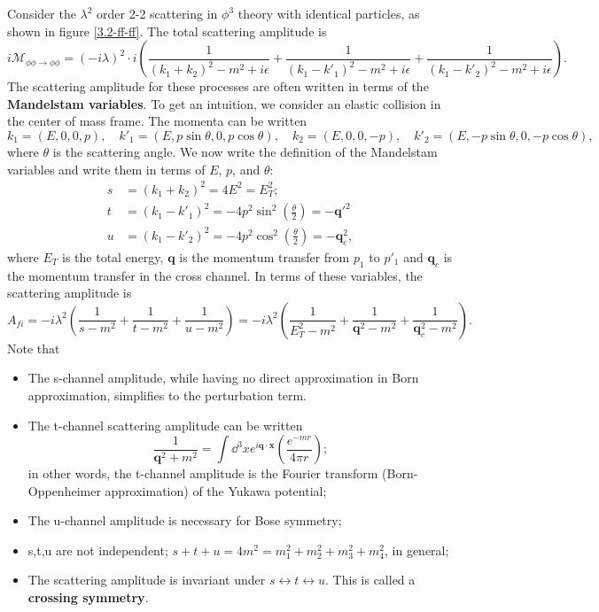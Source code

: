 \documentclass{article}
\begin{document}
\example Consider the $\lambda^2$ order 2-2 scattering in $\phi^3$ theory with identical particles, as shown in figure \ref{3.2-ff-ff}. The total scattering amplitude is 
$$i\mathcal M_{\phi\phi\to\phi\phi}=(-i\lambda)^2\cdot i\left(\frac{1}{(k_1+k_2)^2-m^2+i\epsilon}+\frac{1}{(k_1-k'_1)^2-m^2+i\epsilon}+\frac 1{(k_1-k'_2)^2-m^2+i\epsilon}\right).$$
The scattering amplitude for these processes are often written in terms of the \textbf{Mandelstam variables}. To get an intuition, we consider an elastic collision in the center of mass frame. The momenta can be written 
$$k_1=(E,0,0,p),\quad k'_1=(E,p\sin\theta,0,p\cos\theta),\quad k_2=(E,0,0,-p),\quad k'_2=(E,-p\sin\theta,0,-p\cos\theta),$$
where $\theta$ is the scattering angle. We now write the definition of the Mandelstam variables and write them in terms of $E$, $p$, and $\theta$:
\begin{align*}
    s&=(k_1+k_2)^2=4E^2=E_T^2;\\
    t&=(k_1-k'_1)^2=-4p^2\sin^2\left(\frac\theta 2\right)=-\mathbf q'^2\\
    u&=(k_1-k'_2)^2=-4p^2\cos^2\left(\frac\theta 2\right)=-\mathbf q_c^2,
\end{align*}
where $E_T$ is the total energy, $\mathbf q$ is the momentum transfer from $p_1$ to $p'_1$ and $\mathbf q_c$ is the momentum transfer in the cross channel. In terms of these variables, the scattering amplitude is 
$$A_{fi}=-i\lambda^2\left(\frac 1{s-m^2}+\frac 1{t-m^2}+\frac 1{u-m^2}\right)=-i\lambda^2\left(\frac 1{E_T^2-m^2}+\frac 1{\mathbf q^2-m^2}+\frac 1{\mathbf q_c^2-m^2}\right).$$
Note that
\begin{itemize}
    \item The s-channel amplitude, while having no direct approximation in Born approximation, simplifies to the perturbation term.
    \item The t-channel scattering amplitude can be written 
    $$\frac 1{\mathbf q^2+m^2}=\int\dd^3xe^{i\mathbf q\cdot\mathbf x}\left(\frac{e^{-mr}}{4\pi r}\right);$$
    in other words, the t-channel amplitude is the Fourier transform (Born-Oppenheimer approximation) of the Yukawa potential;
    \item The u-channel amplitude is necessary for Bose symmetry;
    \item s,t,u are not independent; $s+t+u=4m^2=m^2_1+m_2^2+m_3^2+m_4^2$, in general;
    \item The scattering amplitude is invariant under $s\leftrightarrow t\leftrightarrow u$. This is called a \textbf{crossing symmetry}. 
\end{itemize}
\end{document}
